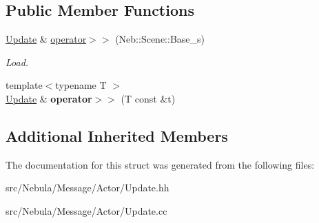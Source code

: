 \subsection*{Public Member Functions}
\begin{DoxyCompactItemize}
\item 
\hypertarget{structNeb_1_1Message_1_1Actor_1_1IUpdate_a8f7b5c8de10ee6107239c6b472d13780}{\hyperlink{structNeb_1_1Message_1_1Actor_1_1Update}{Update} \& \hyperlink{structNeb_1_1Message_1_1Actor_1_1IUpdate_a8f7b5c8de10ee6107239c6b472d13780}{operator$>$$>$} (Neb\-::\-Scene\-::\-Base\-\_\-s)}\label{structNeb_1_1Message_1_1Actor_1_1IUpdate_a8f7b5c8de10ee6107239c6b472d13780}

\begin{DoxyCompactList}\small\item\em Load. \end{DoxyCompactList}\item 
\hypertarget{structNeb_1_1Message_1_1Actor_1_1IUpdate_a521531b8a8e3b8fa7621278b490e4346}{{\footnotesize template$<$typename T $>$ }\\\hyperlink{structNeb_1_1Message_1_1Actor_1_1Update}{Update} \& {\bfseries operator$>$$>$} (T const \&t)}\label{structNeb_1_1Message_1_1Actor_1_1IUpdate_a521531b8a8e3b8fa7621278b490e4346}

\end{DoxyCompactItemize}
\subsection*{Additional Inherited Members}


The documentation for this struct was generated from the following files\-:\begin{DoxyCompactItemize}
\item 
src/\-Nebula/\-Message/\-Actor/Update.\-hh\item 
src/\-Nebula/\-Message/\-Actor/Update.\-cc\end{DoxyCompactItemize}
